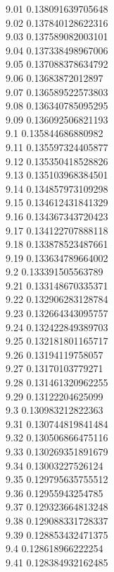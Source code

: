 {9.01	0.138091639705648\\
9.02	0.137840128622316\\
9.03	0.137589082003101\\
9.04	0.137338498967006\\
9.05	0.137088378634792\\
9.06	0.13683872012897\\
9.07	0.136589522573803\\
9.08	0.136340785095295\\
9.09	0.136092506821193\\
9.1	0.135844686880982\\
9.11	0.135597324405877\\
9.12	0.135350418528826\\
9.13	0.135103968384501\\
9.14	0.134857973109298\\
9.15	0.134612431841329\\
9.16	0.134367343720423\\
9.17	0.134122707888118\\
9.18	0.133878523487661\\
9.19	0.133634789664002\\
9.2	0.133391505563789\\
9.21	0.133148670335371\\
9.22	0.132906283128784\\
9.23	0.132664343095757\\
9.24	0.132422849389703\\
9.25	0.132181801165717\\
9.26	0.13194119758057\\
9.27	0.13170103779271\\
9.28	0.131461320962255\\
9.29	0.13122204625099\\
9.3	0.130983212822363\\
9.31	0.130744819841484\\
9.32	0.130506866475116\\
9.33	0.130269351891679\\
9.34	0.13003227526124\\
9.35	0.129795635755512\\
9.36	0.12955943254785\\
9.37	0.129323664813248\\
9.38	0.129088331728337\\
9.39	0.128853432471375\\
9.4	0.128618966222254\\
9.41	0.128384932162485\\
}
